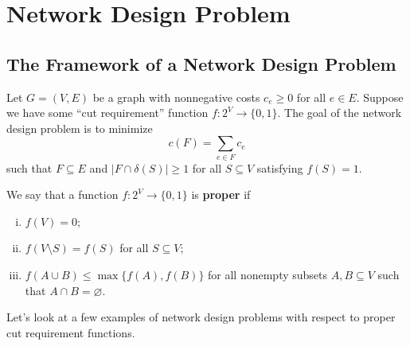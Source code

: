 \section{Network Design Problem} \label{sec:7}

\subsection{The Framework of a Network Design Problem} \label{subsec:7.1}
Let $G = (V, E)$ be a 
graph with nonnegative costs $c_e \geq 0$ for all $e \in E$. 
Suppose we have some ``cut requirement'' function $f : 2^V \to \{0, 1\}$. 
The goal of the network design problem is to minimize 
\[ c(F) = \sum_{e \in F} c_e \] 
such that $F \subseteq E$ and $|F \cap \delta(S)| \geq 1$ for all $S 
\subseteq V$ satisfying $f(S) = 1$. 

We say that a function $f : 2^V \to \{0, 1\}$ is {\bf proper} if 
\begin{enumerate}[(i)]
    \item $f(V) = 0$;
    \item $f(V \setminus S) = f(S)$ for all $S \subseteq V$;
    \item $f(A \cup B) \leq \max\{f(A), f(B)\}$ for all nonempty
    subsets $A,B \subseteq V$ such that $A \cap B = \varnothing$. 
\end{enumerate}
Let's look at a few examples of network design problems with 
respect to proper cut requirement functions. 

